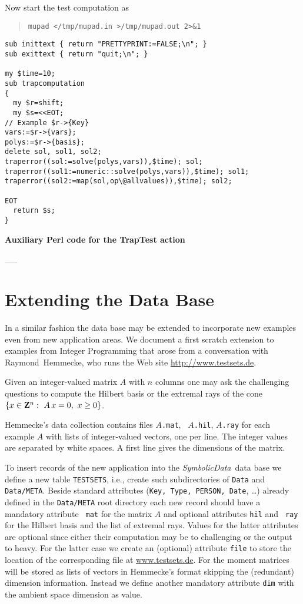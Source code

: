 \documentclass[11pt]{article}
\newcommand{\SD}{{\em Symbo\-lic\-Data}}
\begin{document}
Now start the test computation as
\begin{quote}\tt mupad </tmp/mupad.in >/tmp/mupad.out 2>\&1\end{quote} 

\begin{table}[ht]
{\small\begin{verbatim}
sub inittext { return "PRETTYPRINT:=FALSE;\n"; }
sub exittext { return "quit;\n"; }

my $time=10;
sub trapcomputation 
{
  my $r=shift;
  my $s=<<EOT;
// Example $r->{Key}
vars:=$r->{vars};
polys:=$r->{basis};
delete sol, sol1, sol2;
traperror((sol:=solve(polys,vars)),$time); sol; 
traperror((sol1:=numeric::solve(polys,vars)),$time); sol1; 
traperror((sol2:=map(sol,op\@allvalues)),$time); sol2; 

EOT
  return $s;
}
\end{verbatim}}
\centerline{\bf Auxiliary Perl code for the TrapTest action}
\_\hrulefill\_
\end{table}

\section{Extending the Data Base}

In a similar fashion the data base may be extended to incorporate new
examples even from new application areas. We document a first scratch
extension to examples from Integer Programming that arose from a
conversation with Raymond~Hemmecke, who runs the Web site
\url{http://www.testsets.de}.

Given an integer-valued matrix $A$ with $n$ columns one may ask
the challenging questions to compute the Hilbert basis or the
extremal rays of the cone $\{x \in {\bf Z}^n:\ A\,x=0,\ x\geq
0\}$.

Hemmecke's data collection contains files {\tt $A$.mat}, {\tt
$A$.hil}, {\tt $A$.ray} for each example $A$ with lists of
integer-valued vectors, one per line. The integer values are
separated by white spaces. A first line gives the dimensions of
the matrix.

To insert records of the new application into the \SD\ data base we
define a new table {\tt TESTSETS}, i.e., create such subdirectories of
{\tt Data} and {\tt Data/META}.  Beside standard attributes ({\tt Key,
Type, PERSON, Date}, \ldots) already defined in the {\tt Data/META}
root directory each new record should have a mandatory attribute {\tt
mat} for the matrix $A$ and optional attributes {\tt hil} and {\tt
ray} for the Hilbert basis and the list of extremal rays. Values for
the latter attributes are optional since either their computation may
be to challenging or the output to heavy. For the latter case we
create an (optional) attribute {\tt file} to store the location of the
corresponding file at \url{www.testsets.de}.  For the moment matrices
will be stored as lists of vectors in Hemmecke's format skipping the
(redundant) dimension information. Instead we define another mandatory
attribute {\tt dim} with the ambient space dimension as value.
\end{document}
